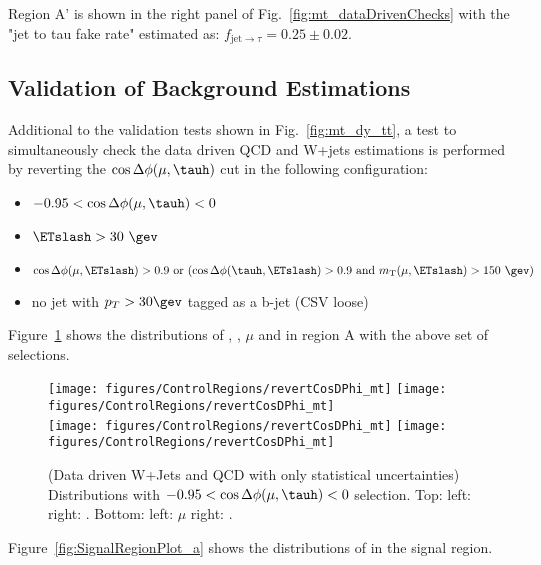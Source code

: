 Region A' is shown in the right panel of Fig.~\ref{fig:mt_dataDrivenChecks} 
with the "jet to tau fake rate" estimated as: $f_{\text{jet}\rightarrow\tau} = 0.25 \pm 0.02$.

\subsection{Validation of Background Estimations}
Additional to the validation tests shown in Fig.~\ref{fig:mt_dy_tt}, a test 
to simultaneously check the data driven QCD and W+jets estimations is performed 
by reverting the $\cos{\Delta \phi (\mu,\tauh)}$ cut in the following configuration:
\begin{itemize}
  \item $ -0.95 < \cos{\Delta \phi (\mu,\tauh)} < 0$
  \item $\ETslash>30~\gev$
  \item $\cos{\Delta \phi (\mu,\ETslash)} > 0.9~\text{or}~(\cos{\Delta \phi (\tauh,\ETslash)} > 0.9~\text{and}~m_{\text{T}}(\mu,\ETslash) > 150~\gev)$
  \item no jet with $p_T>30\gev$ tagged as a b-jet (CSV loose)
\end{itemize}

Figure~\ref{fig:revertCosDPhi_mt} shows the distributions of \meffmtau, \ETslash, 
$\mu$ \pt and  \tauh \pt in region A with the above set of selections. 

\begin{figure}\centering
  \texttt{[image: figures/ControlRegions/revertCosDPhi\_mt]}
  \texttt{[image: figures/ControlRegions/revertCosDPhi\_mt]}\\
  \texttt{[image: figures/ControlRegions/revertCosDPhi\_mt]}
  \texttt{[image: figures/ControlRegions/revertCosDPhi\_mt]}
  \caption{\label{fig:revertCosDPhi_mt} (Data driven W+Jets and QCD with only statistical uncertainties)
 Distributions with $ -0.95 < \cos{\Delta \phi (\mu,\tauh)} < 0$ selection. Top: left: 
\meffmtau right: \ETslash. Bottom: left: $\mu$ \pt right: \tauh \pt.}
\end{figure}

Figure~\ref{fig:SignalRegionPlot_a} shows the distributions of \meffmtau in 
the signal region.%

